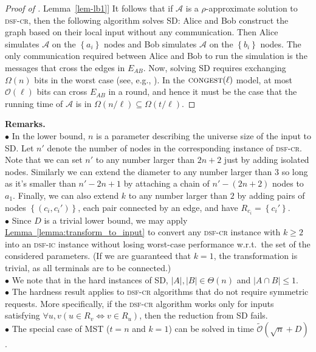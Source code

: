 \documentclass[letterpaper,11pt]{article}
\newcommand{\namedref}[2]{\hyperref[#2]{#1~\ref*{#2}}}
\newcommand{\lemmaref}[1]{\namedref{Lemma}{#1}}
\newcommand{\BO}{\mathcal{O}}
\newcommand{\sO}{\tilde{\mathcal{O}}}
\newcommand{\Set}[1]{\left\{#1\right\}}
\newcommand{\Congest}{\textsc{congest}\xspace}
\def\cA{\mathcal{A}}
\newcommand{\sfcr}{\textsc{dsf-cr}\xspace}
\newcommand{\sfic}{\textsc{dsf-ic}\xspace}
\begin{document}
\begin{proof}[Proof of \lemmaref{lem-lb1}]
It follows that if $\cA$ is a $\rho$-approximate solution to \sfcr,
then the following algorithm solves SD: Alice and Bob construct the
graph based on their local input without any communication. Then Alice
simulates $\cA$ on the $\Set{a_i}$ nodes  and Bob simulates $\cA$ on
the $\Set{b_i}$ nodes. The only communication required between Alice
and Bob to run the simulation is the messages that cross the edges in
$E_{AB}$. Now,  solving SD requires exchanging $\Omega(n)$ bits
in the worst case (see,
e.g., \cite{KushilevitzN-book}). In the $\Congest(\ell)$ model,
at most $\BO(\ell)$ bits can cross $E_{AB}$ in a round, and hence it must
be the case that the running time of $\cA$ is in
$\Omega(n/\ell)\subseteq\Omega(t/\ell)$.
\end{proof}

\noindent\textbf{Remarks.}
\\$\bullet$  In the lower bound,  $n$ is a parameter describing the universe
  size  of the input
  to SD. Let $n'$ denote the number of nodes in the  corresponding
  instance of \sfcr. Note that we can set $n'$ to any number larger
  than $2n+2$ just by adding 
  isolated nodes. Similarly we can extend the diameter to any number
  larger than $3$ so long as it's smaller than $n'-2n+1$ by attaching
  a chain of $n'-(2n+2)$ nodes to $a_1$. Finally, we can also extend
  $k$ to any number larger than $2$ by adding pairs of nodes
  $\Set{(c_i,c_i')}$, each pair connected  by an edge, and have
  $R_{c_i}=\Set{c_i'}$.
\\$\bullet$  Since $D$ is a trivial
lower bound, we may apply
\lemmaref{lemma:transform_to_input} to convert any \sfcr instance with
$k\geq 2$ into an \sfic instance without losing worst-case performance
w.r.t.\ the 
set of the considered parameters. (If we are
guaranteed that $k=1$, the transformation is trivial, as all terminals
are to be connected.) 
\\$\bullet$  We note that in the hard instances of SD, $|A|,|B|\in\Theta(n)$
  and $|A\cap B|\le1$.
\\$\bullet$  The hardness result applies to \sfcr algorithms that do not require
  symmetric requests. More specifically, if the \sfcr algorithm works only
  for inputs satisfying  $\forall u,v(u\in R_v \iff v\in R_u)$, then the reduction from
  SD fails.
\\$\bullet$  The special case of MST ($t=n$ and $k=1$) can be solved
in time $\sO(\sqrt n+D)$ \cite{KuttenP-98}. 
\end{document}
